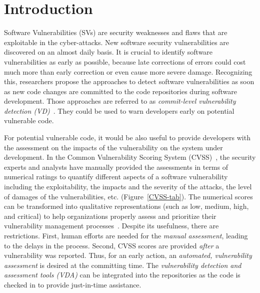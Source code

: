 \section{Introduction}
\label{intro:sec}

Software Vulnerabilities (SVs) are security weaknesses and flaws that
are exploitable in the cyber-attacks. New software security
vulnerabilities are discovered on an almost daily basis. It is crucial
to identify software vulnerabilities as early as possible, because
late corrections of errors could cost much more than early correction
or even cause more severe damage. Recognizing this, researchers
propose the approaches to detect software vulnerabilities as soon as
new code changes are committed to the code repositories during
software development. Those approaches are referred to as {\em
  commit-level vulnerability detection
  (VD)}~\cite{perl2015vccfinder,zhou2017automated,chen2019large}. They
could be used to warn developers early on potential vulnerable code.

For potential vulnerable code, it would be also useful to provide
developers with the assessment on the impacts of the vulnerability on
the system under development. In the Common Vulnerability Scoring
System (CVSS)~\cite{first-website}, the security experts and analysts
have manually provided the assessments in terms of numerical ratings
to quantify different aspects of a software vulnerability including
the exploitability, the impacts and the severity of the attacks, the
level of damages of the vulnerabilities,
etc. (Figure~\ref{CVSS-tab}). The numerical scores can be transformed
into qualitative representations (such as low, medium, high, and
critical) to help organizations properly assess and prioritize their
vulnerability management processes~\cite{first-website}. Despite its
usefulness, there are restrictions. First, human efforts are needed
for the {\em manual assessment}, leading to the delays in the process.
Second, CVSS scores are provided {\em after} a vulnerability was
reported. Thus, for an early action, an {\em automated, vulnerability
  assessment} is desired at the committing time. The {\em
  vulnerability detection and assessment tools (VDA)} can be
integrated into the repositories as the code is checked in to provide
just-in-time assistance.


